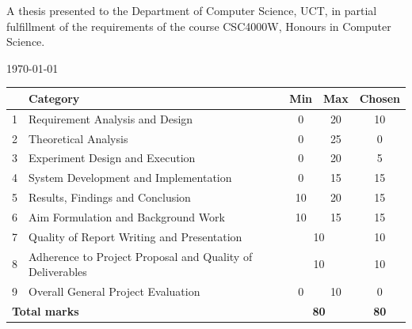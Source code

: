 \begin{titlepage}

\begin{center}
 A thesis presented to the Department of Computer Science, UCT, in partial fulfillment of the requirements of the course CSC4000W, Honours in Computer Science.
\end{center}
\vspace{1cm}

{\large \today}\\[1cm] %
\begin{tabular}{|c|l|c|c|c|}
 \hline
   & \textbf{Category} & \textbf{Min} & \textbf{Max} & \textbf{Chosen} \\
 \hline
 1 & Requirement Analysis and Design & 0 & 20 & 10 \\
 \hline
 2 & Theoretical Analysis & 0 & 25 & 0 \\
 \hline
 3 & Experiment Design and Execution & 0 & 20 & 5 \\
 \hline
 4 & System Development and Implementation & 0 & 15 & 15 \\
 \hline
 5 & Results, Findings and Conclusion & 10 & 20 & 15 \\
 \hline
 6 & Aim Formulation and Background Work & 10 & 15 & 15 \\
 \hline
 7 & Quality of Report Writing and Presentation & \multicolumn{2}{|c|}{10} & 10 \\
 \hline
 8 & Adherence to Project Proposal and Quality of Deliverables & \multicolumn{2}{|c|}{10} & 10 \\
 \hline
 9 & Overall General Project Evaluation & 0 & 10 & 0 \\
 \hline
 \multicolumn{2}{|l|}{\textbf{Total marks}} & \multicolumn{2}{|c|}{\textbf{80}} & \textbf{80} \\
 \hline
\end{tabular}

 

\vfill %

\end{titlepage}
